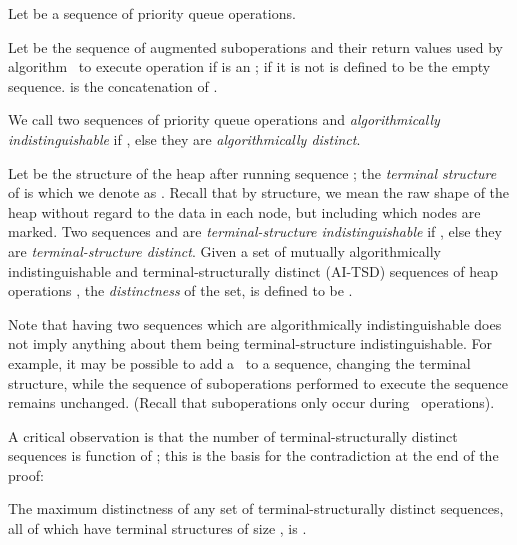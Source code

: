 Let    be a sequence of priority queue operations.
\begin{fullonly}

\end{fullonly}
Let  be the sequence of augmented suboperations and their return values used by algorithm \alg\ to execute operation  if  is an \opEm ; if it is not  is defined to be the empty sequence.  is the concatenation of .
\begin{fullonly}

\end{fullonly}
We call two sequences of priority queue operations  and  \emph{algorithmically indistinguishable} if , else they are \emph{algorithmically distinct}.
\begin{fullonly}

\end{fullonly}
Let  be the structure of the heap after running sequence ; the \emph{terminal structure} of  is  which we denote as . Recall that by structure, we mean the raw shape of the heap without regard to the data in each node, but including which nodes are marked. Two sequences  and  are \emph{terminal-structure indistinguishable} if , else they are \emph{terminal-structure distinct}.
Given a set of mutually algorithmically indistinguishable and terminal-structurally distinct (AI-TSD) sequences of heap operations , the \emph{distinctness} of the set,  is defined to be . 
\begin{fullonly}

\end{fullonly}
{Note that having two sequences which are algorithmically indistinguishable does not imply anything about them being terminal-structure indistinguishable. For example, it may be possible to add a \opDc\ to a sequence, changing the terminal structure, while the sequence of suboperations performed to execute the sequence remains unchanged. (Recall that suboperations only occur during \opEm\ operations).}
\begin{fullonly}

\end{fullonly}
A critical observation is that the number of terminal-structurally distinct sequences is function of ; this is the basis for the contradiction at the end of the proof:

\begin{lemma} 
The maximum distinctness of any set  of terminal-structurally distinct sequences, all of which have terminal structures of size , is .
\end{lemma}

